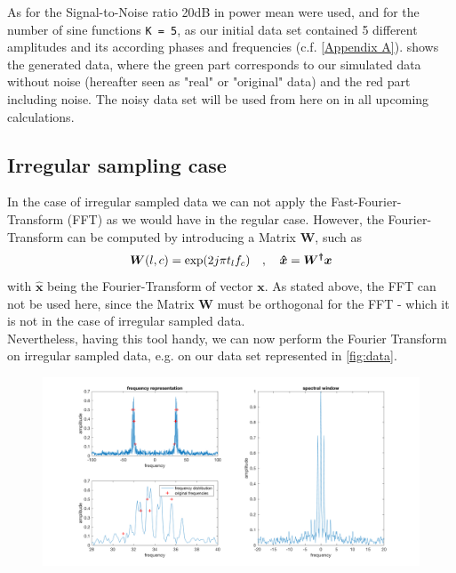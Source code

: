 As for the Signal-to-Noise ratio 20dB in power mean were used, and for the number of sine functions \texttt{K = 5}, as our initial data set contained 5 different amplitudes and its according phases and frequencies (c.f. \cref{Appendix A}).
 shows the generated data, where the green part corresponds to our simulated data without noise (hereafter seen as "real" or "original" data) and the red part including noise. The noisy data set will be used from here on in all upcoming calculations.



\subsection{Irregular sampling case}
In the case of irregular sampled data we can not apply the Fast-Fourier-Transform (FFT) as we would have in the regular case. However, the Fourier-Transform can be computed by introducing a Matrix $\boldsymbol{W}$, such as
\begin{equation}
	\centering
	\boldsymbol{W}(l,c) = \exp(2j\pi t_l f_c) \quad ,\quad \boldsymbol{\hat{x}} = \boldsymbol{W^\dagger}\boldsymbol{x}
\end{equation}
with $\boldsymbol{\hat{x}}$ being the Fourier-Transform of vector $\boldsymbol{x}$. As stated above, the FFT can not be used here, since the Matrix $\boldsymbol{W}$ must be orthogonal for the FFT - which it is not in the case of irregular sampled data.\\
Nevertheless, having this tool handy, we can now perform the Fourier Transform on irregular sampled data, e.g. on our data set represented in \cref{fig:data}.

\begin{figure}[h!]
	\centering
	\includegraphics[width=\textwidth]{images/data_freq}
	\caption{}
	\label{fig:data_freq}
\end{figure}

